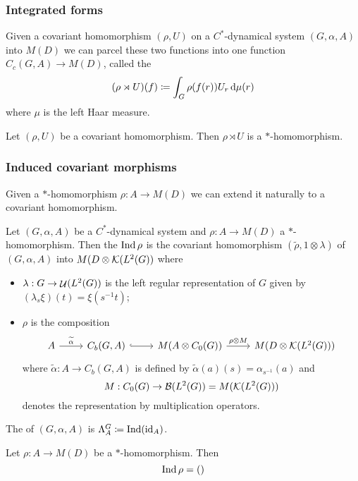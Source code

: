 \subsubsection{Integrated forms}
\begin{definition}
Given a covariant homomorphism $(\rho, U)$ on a $C^*$-dynamical system $(G,\alpha, A)$ into $M(D)$ we can parcel these two functions into one function $C_c(G,A)\to M(D)$, called the 
\[ (\rho \rtimes U) (f)  \coloneqq \int_G\rho(f(r))U_r \operatorname{d \!}\mu(r) \]
where $\mu$ is the left Haar measure.
\end{definition}
\begin{lemma}
Let $(\rho, U)$ be a covariant homomorphism. Then $\rho \rtimes U$ is a $*$-homomorphism.
\end{lemma}

\subsubsection{Induced covariant morphisms}
Given a $*$-homomorphism $\rho: A\to M(D)$ we can extend it naturally to a covariant homomorphism.
\begin{definition}
Let $(G, \alpha, A)$ be a $C^*$-dynamical system and $\rho: A\to M(D)$ a $*$-homomorphism. Then the  $\operatorname{Ind} \rho$ is the covariant homomorphism $(\widetilde{\rho}, 1\otimes \lambda)$ of $(G, \alpha, A)$ into $M(D\otimes\operatorname{\mathcal{K}}(L^2(G))$ where
\begin{itemize}
\item $\lambda: G\to \mathop{\mathcal{U}}\nolimits(L^2(G))$ is the left regular representation of $G$ given by $(\lambda_s\xi)(t) =\xi(s^{-1}t)$;
\item $\rho$ is the composition
\[ \begin{tikzcd}
A \rar{\widetilde{\alpha}} & C_b(G,A) \ar[r,hook] & M(A\otimes C_0(G)) \rar{\rho\otimes M} & M(D\otimes \Compact(L^2(G)))
\end{tikzcd} \]
where $\widetilde{\alpha}: A\to C_b(G,A)$ is defined by $\widetilde{\alpha}(a)(s)= \alpha_{s^{-1}}(a)$ and 
\[ M: C_0(G)\to \operatorname{\mathcal{B}}(L^2(G)) = M(\operatorname{\mathcal{K}}(L^2(G))) \]
denotes the representation by multiplication operators.
\end{itemize}
\end{definition}
The  of $(G, \alpha, A)$ is $\Lambda^G_A \coloneqq \operatorname{Ind}(\operatorname{id}_A)$.

\begin{lemma}
Let $\rho: A\to M(D)$ be a $*$-homomorphism. Then
\[ \operatorname{Ind}\rho = () \]
\end{lemma}

